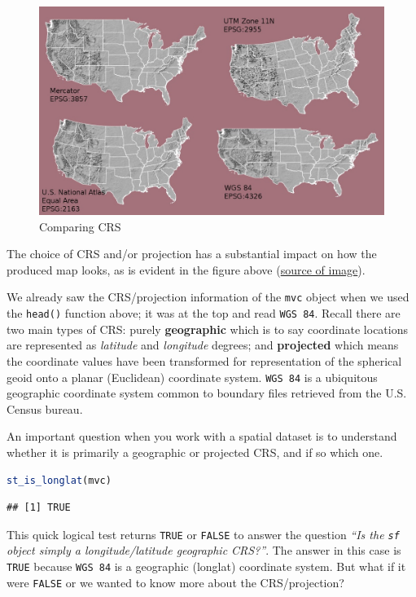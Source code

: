 \documentclass[
]{book}
\newcommand{\passthrough}[1]{#1}
\begin{document}
\begin{figure}
\includegraphics[width=0.5\linewidth]{images/compare-crs} \caption{Comparing CRS}\label{fig:unnamed-chunk-20}
\end{figure}

The choice of CRS and/or projection has a substantial impact on how the produced map looks, as is evident in the figure above (\href{https://datacarpentry.org/organization-geospatial/03-crs/}{source of image}).

We already saw the CRS/projection information of the \passthrough{\lstinline!mvc!} object when we used the \passthrough{\lstinline!head()!} function above; it was at the top and read \passthrough{\lstinline!WGS 84!}. Recall there are two main types of CRS: purely \textbf{geographic} which is to say coordinate locations are represented as \emph{latitude} and \emph{longitude} degrees; and \textbf{projected} which means the coordinate values have been transformed for representation of the spherical geoid onto a planar (Euclidean) coordinate system. \passthrough{\lstinline!WGS 84!} is a ubiquitous geographic coordinate system common to boundary files retrieved from the U.S. Census bureau.

An important question when you work with a spatial dataset is to understand whether it is primarily a geographic or projected CRS, and if so which one.

\begin{lstlisting}[language=R]
st_is_longlat(mvc)
\end{lstlisting}

\begin{lstlisting}
## [1] TRUE
\end{lstlisting}

This quick logical test returns \passthrough{\lstinline!TRUE!} or \passthrough{\lstinline!FALSE!} to answer the question \emph{``Is the \passthrough{\lstinline!sf!} object simply a longitude/latitude geographic CRS?''}. The answer in this case is \passthrough{\lstinline!TRUE!} because \passthrough{\lstinline!WGS 84!} is a geographic (longlat) coordinate system. But what if it were \passthrough{\lstinline!FALSE!} or we wanted to know more about the CRS/projection?
\end{document}
